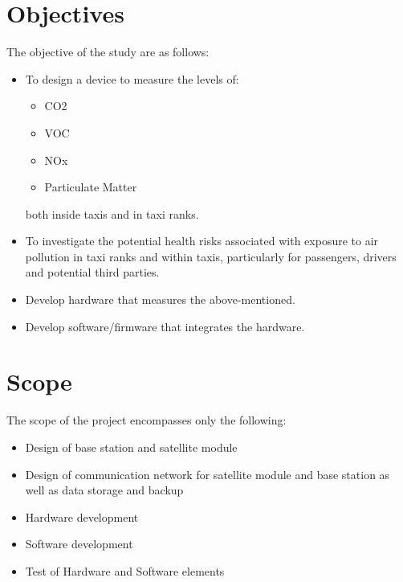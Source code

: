 \section{Objectives}
The objective of the study are as follows:
\begin{itemize}
	\item To design a device to measure the levels of:
		\begin{itemize}
			\item CO2
			\item VOC
			\item NOx
			\item Particulate Matter
		\end{itemize}
 both inside taxis and in taxi ranks.
	\item To investigate the potential health risks associated with exposure to air pollution in taxi ranks and within taxis, particularly for passengers, drivers and potential third parties.
	\item Develop hardware that measures the above-mentioned.
	\item Develop software/firmware that integrates the hardware.
\end{itemize}




\section{Scope}
The scope of the project encompasses only the following:

\begin{itemize}
	\item Design of base station and satellite module
	\item Design of communication network for satellite module and base station as well as data storage and backup
	\item Hardware development
	\item Software development
	\item Test of Hardware and Software elements
\end{itemize}

